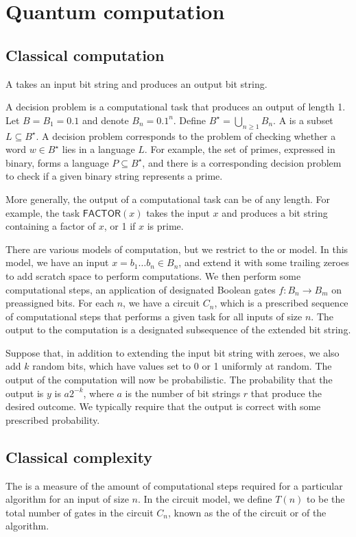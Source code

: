 \section{Quantum computation}

\subsection{Classical computation}
A  takes an input bit string and produces an output bit string.

A decision problem is a computational task that produces an output of length 1.
Let $B = B_1 = \qty{0,1}$ and denote $B_n = \qty{0,1}^n$.
Define $B^\star = \bigcup_{n \geq 1} B_n$.
A  is a subset $L \subseteq B^\star$.
A decision problem corresponds to the problem of checking whether a word $w \in B^\star$ lies in a language $L$.
For example, the set of primes, expressed in binary, forms a language $P \subseteq B^\star$, and there is a corresponding decision problem to check if a given binary string represents a prime.

More generally, the output of a computational task can be of any length.
For example, the task $\mathsf{FACTOR}(x)$ takes the input $x$ and produces a bit string containing a factor of $x$, or 1 if $x$ is prime.

There are various models of computation, but we restrict to the  or  model.
In this model, we have an input $x = b_1 \dots b_n \in B_n$, and extend it with some trailing zeroes to add scratch space to perform computations.
We then perform some computational steps, an application of designated Boolean gates $f \colon B_n \to B_m$ on preassigned bits.
For each $n$, we have a circuit $C_n$, which is a prescribed sequence of computational steps that performs a given task for all inputs of size $n$.
The output to the computation is a designated subsequence of the extended bit string.

Suppose that, in addition to extending the input bit string with zeroes, we also add $k$ random bits, which have values set to 0 or 1 uniformly at random.
The output of the computation will now be probabilistic.
The probability that the output is $y$ is $a2^{-k}$, where $a$ is the number of bit strings $r$ that produce the desired outcome.
We typically require that the output is correct with some prescribed probability.

\subsection{Classical complexity}
The  is a measure of the amount of computational steps required for a particular algorithm for an input of size $n$.
In the circuit model, we define $T(n)$ to be the total number of gates in the circuit $C_n$, known as the  of the circuit or  of the algorithm.

